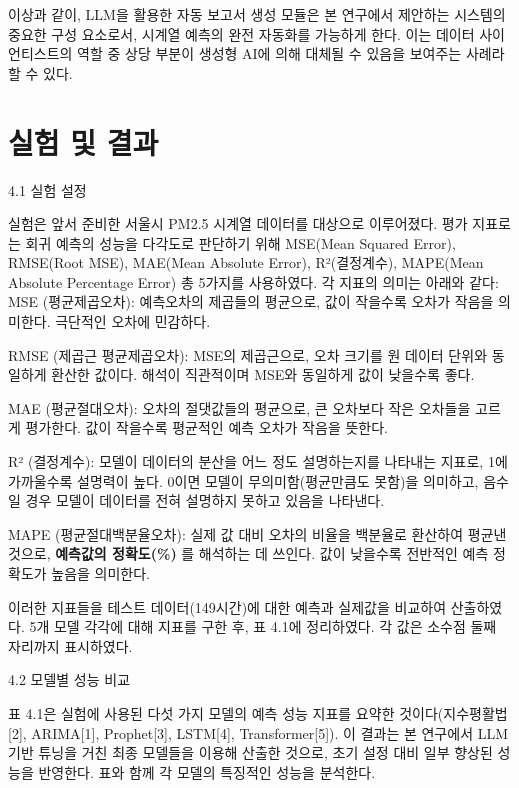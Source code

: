 \documentclass[12pt,ko,a4,]{report}
\begin{document}
이상과 같이, LLM을 활용한 자동 보고서 생성 모듈은 본 연구에서 제안하는
시스템의 중요한 구성 요소로서, 시계열 예측의 완전 자동화를 가능하게
한다. 이는 데이터 사이언티스트의 역할 중 상당 부분이 생성형 AI에 의해
대체될 수 있음을 보여주는 사례라 할 수 있다.

\chapter{실험 및 결과}

4.1 실험 설정

실험은 앞서 준비한 서울시 PM2.5 시계열 데이터를 대상으로 이루어졌다.
평가 지표로는 회귀 예측의 성능을 다각도로 판단하기 위해 MSE(Mean Squared
Error), RMSE(Root MSE), MAE(Mean Absolute Error), R²(결정계수),
MAPE(Mean Absolute Percentage Error) 총 5가지를 사용하였다. 각 지표의
의미는 아래와 같다: MSE (평균제곱오차): 예측오차의 제곱들의 평균으로,
값이 작을수록 오차가 작음을 의미한다. 극단적인 오차에 민감하다.

RMSE (제곱근 평균제곱오차): MSE의 제곱근으로, 오차 크기를 원 데이터
단위와 동일하게 환산한 값이다. 해석이 직관적이며 MSE와 동일하게 값이
낮을수록 좋다.

MAE (평균절대오차): 오차의 절댓값들의 평균으로, 큰 오차보다 작은
오차들을 고르게 평가한다. 값이 작을수록 평균적인 예측 오차가 작음을
뜻한다.

R² (결정계수): 모델이 데이터의 분산을 어느 정도 설명하는지를 나타내는
지표로, 1에 가까울수록 설명력이 높다. 0이면 모델이 무의미함(평균만큼도
못함)을 의미하고, 음수일 경우 모델이 데이터를 전혀 설명하지 못하고
있음을 나타낸다.

MAPE (평균절대백분율오차): 실제 값 대비 오차의 비율을 백분율로 환산하여
평균낸 것으로, \textbf{예측값의 정확도(\%)} 를 해석하는 데 쓰인다. 값이
낮을수록 전반적인 예측 정확도가 높음을 의미한다.

이러한 지표들을 테스트 데이터(149시간)에 대한 예측과 실제값을 비교하여
산출하였다. 5개 모델 각각에 대해 지표를 구한 후, 표 4.1에 정리하였다. 각
값은 소수점 둘째 자리까지 표시하였다.

4.2 모델별 성능 비교

표 4.1은 실험에 사용된 다섯 가지 모델의 예측 성능 지표를 요약한
것이다(지수평활법{[}2{]}, ARIMA{[}1{]}, Prophet{[}3{]}, LSTM{[}4{]},
Transformer{[}5{]}). 이 결과는 본 연구에서 LLM 기반 튜닝을 거친 최종
모델들을 이용해 산출한 것으로, 초기 설정 대비 일부 향상된 성능을
반영한다. 표와 함께 각 모델의 특징적인 성능을 분석한다.
\end{document}
